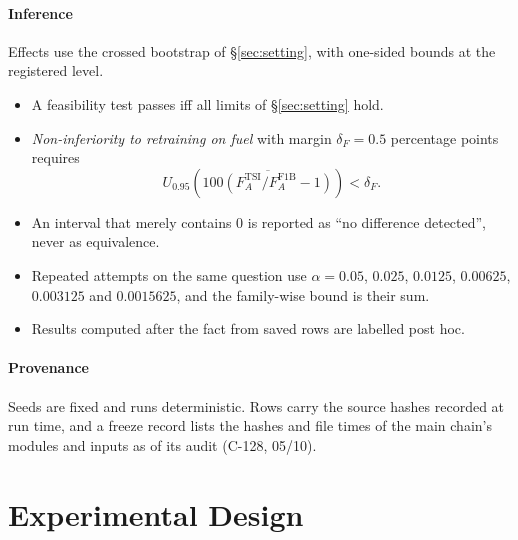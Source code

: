 \paragraph{Inference} Effects use the crossed bootstrap of §\ref{sec:setting}, with one-sided bounds at the registered level.
\begin{itemize}\setlength\itemsep{1pt}
\item A feasibility test passes iff all limits of §\ref{sec:setting} hold.
\item \emph{Non-inferiority to retraining on fuel} with margin $\delta_F=0.5$ percentage points requires
\begin{equation}
U_{0.95}\!\left(\overline{100(F_A^{\mathrm{TSI}}/F_A^{\mathrm{F1B}}-1)}\right)<\delta_F.
\end{equation}
\item An interval that merely contains 0 is reported as ``no difference detected'', never as equivalence.
\item Repeated attempts on the same question use $\alpha=0.05$, $0.025$, $0.0125$, $0.00625$, $0.003125$ and $0.0015625$, and the family-wise bound is their sum.
\item Results computed after the fact from saved rows are labelled post hoc.
\end{itemize}
\paragraph{Provenance} Seeds are fixed and runs deterministic. Rows carry the source hashes recorded at run time, and a freeze record lists
the hashes and file times of the main chain's modules and inputs as of its audit (C-128, 05/10).

\section{Experimental Design}\label{sec:design}
